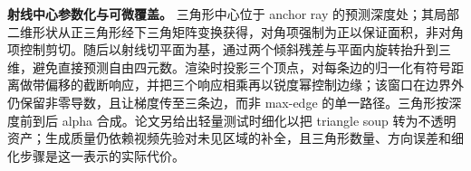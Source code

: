 \textbf{射线中心参数化与可微覆盖。} 三角形中心位于 anchor ray 的预测深度处；其局部二维形状从正三角形经下三角矩阵变换获得，对角项强制为正以保证面积，非对角项控制剪切。随后以射线切平面为基，通过两个倾斜残差与平面内旋转抬升到三维，避免直接预测自由四元数。渲染时投影三个顶点，对每条边的归一化有符号距离做带偏移的截断响应，并把三个响应相乘再以锐度幂控制边缘；该窗口在边界外仍保留非零导数，且让梯度传至三条边，而非 max-edge 的单一路径。三角形按深度前到后 alpha 合成。论文另给出轻量测试时细化以把 triangle soup 转为不透明资产；生成质量仍依赖视频先验对未见区域的补全，且三角形数量、方向误差和细化步骤是这一表示的实际代价。
